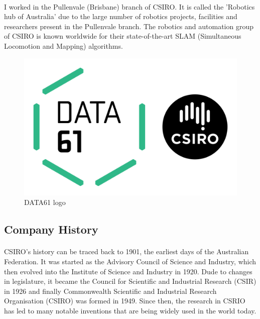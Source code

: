 \paragraph{}
I worked in the Pullenvale (Brisbane) branch of CSIRO. It is called the 'Robotics hub of Australia' due to the large number of robotics projects, facilities and researchers present in the Pullenvale branch. The robotics and automation group of CSIRO is known worldwide for their state-of-the-art SLAM (Simultaneous Locomotion and Mapping) algorithms.

\begin{figure}[h]
\centering
\includegraphics[trim=0cm 0cm 0cm 0cm, clip=true,scale=1]{figures/data61_logo.png}
\caption{DATA61 logo\label{Fig:data61}}\vspace{-4mm}
\end{figure}


\subsection{Company History}

\paragraph{}
CSIRO's history can be traced back to 1901, the earliest days of the Australian Federation. It was started as the Advisory Council of Science and Industry, which then evolved into the Institute of Science and Industry in 1920. Dude to changes in legislature, it became the Council for Scientific and Industrial Research (CSIR) in 1926 and finally Commonwealth Scientific and Industrial Research Organisation (CSIRO) was formed in 1949. Since then, the research in CSRIO has led to many notable inventions that are being widely used in the world today.

